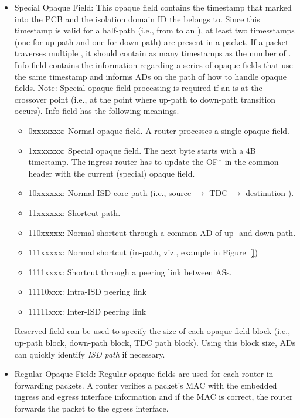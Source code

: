 \begin{itemize}
\item{Special Opaque Field: }This opaque field contains the timestamp that \ISDC \AD marked into the PCB and the isolation domain ID the \AD belongs to. Since this timestamp is valid for a half-path (i.e., from \ISDC to an \STUB \AD), at least two timesstamps (one for up-path and one for down-path) are present in a packet. If a packet traverses multiple \ISDs, it should contain as many timestamps as the number of \ISDs. Info field contains the information regarding a series of opaque fields that use the same timestamp and informs ADs on the path of how to handle opaque fields. Note: Special opaque field processing is required if an \AD is at the crossover point (i.e., at the point where up-path to down-path transition occurs). Info field has the following meanings.
	\begin{itemize}
	\item{0xxxxxxx}: Normal opaque field. A router processes a single opaque field.
	\item{1xxxxxxx}: Special opaque field. The next byte starts with a 4B timestamp. The ingress router has to update the OF* in the common header with the current (special) opaque field.
	\item{10xxxxxx}: Normal ISD core path (i.e., source \AD $\rightarrow$ TDC $\rightarrow$ destination \AD).
	\item{11xxxxxx}: Shortcut path.
	\item{110xxxxx}: Normal shortcut through a common AD of up- and down-path.
	\item{111xxxxx}: Normal shortcut (in-path, viz., example in Figure~\ref{})
	\item{1111xxxx}: Shortcut through a peering link between ASs.
	\item{11110xxx}: Intra-ISD peering link
	\item{11111xxx}: Inter-ISD peering link
	\end{itemize}
Reserved field can be used to specify the size of each opaque field block (i.e., up-path block, down-path block, TDC path block). Using this block size, ADs can quickly identify {\em ISD path} if necessary.
\item{Regular Opaque Field: }Regular opaque fields are used for each router in forwarding packets. A router verifies a packet's MAC with the embedded ingress and egress interface information and if the MAC is correct, the router forwards the packet to the egress interface.
	\begin{itemize}

\end{itemize}
\end{itemize}
